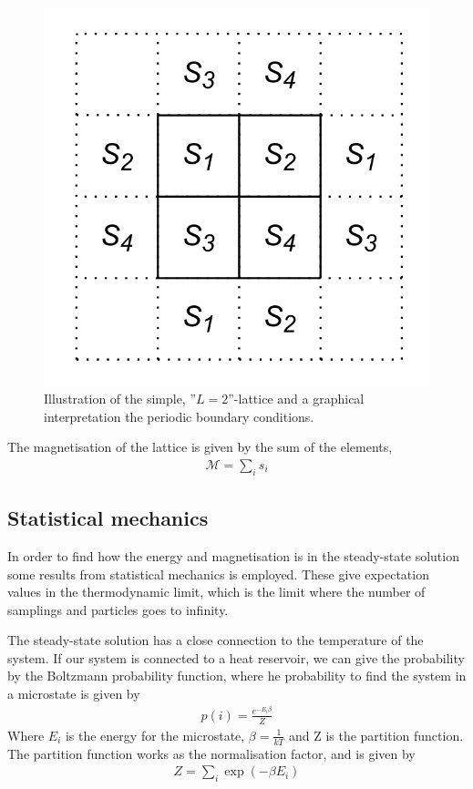 \documentclass[11pt,a4paper,english]{article}
\numberwithin{equation}{section}
\newcommand{\magM}{\mathcal{M}}
\begin{document}
\begin{figure}[H]
\centering
\includegraphics[scale=0.15]{pics/pics4report/simple_lattice.png}
\caption{ Illustration of the simple, ''$L=2$''-lattice and a graphical interpretation the periodic boundary conditions.}
\label{fig:spin_neighbours_full}
\end{figure}

The magnetisation of the lattice is given by the sum of the elements,
\begin{gather}
\magM = \sum_i s_i
\label{eq:Msum}
\end{gather}


\subsection{Statistical mechanics}
In order to find how the energy and magnetisation is in the steady-state
solution some results from statistical mechanics is employed. These 
give expectation values in the thermodynamic limit, which is the limit 
where the number of samplings and particles goes to infinity.

The steady-state solution has a close connection to the temperature 
of the system. If our system is connected to a heat reservoir, we can
give the probability by the Boltzmann probability function,
where he probability to find the system in a microstate is given by
\begin{gather}
p(i) = \frac{e^{-E_i\beta}}{Z}
\end{gather}
Where $E_i$ is the energy for the microstate, $\beta = \frac{1}{kT}$ 
and Z is the partition function. The partition function works as the 
normalisation factor, and is given by
\begin{gather}
Z = \sum_i \exp(-\beta E_i)
\end{gather}
\end{document}
